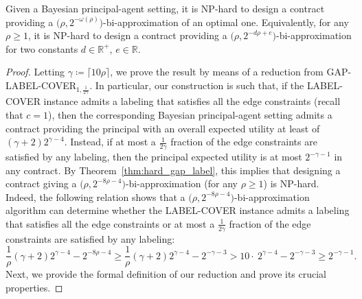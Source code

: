 \begin{theorem} \label{thm:hard_label}
	Given a Bayesian principal-agent setting, it is \textnormal{\textsf{NP}}-hard to design a contract providing a $\big(\rho,2^{-\omega(\rho)} \big)$-bi-approximation of an optimal one. Equivalently, for any $\rho \ge 1$, it is \textnormal{\textsf{NP}}-hard to design a contract providing a $\big(  \rho ,2^{- d \rho + e} \big)$-bi-approximation for two constants $d \in \mathbb{R}^+$, $e \in \mathbb{R}$.
\end{theorem}

\begin{proof}
	Letting $\gamma \coloneqq \lceil {10\rho} \rceil$, we prove the result by means of a reduction from \textsf{GAP-LABEL-COVER}$_{1,\frac{1}{2\gamma}}$.
	In particular, our construction is such that, if the \textsf{LABEL-COVER} instance admits a labeling that satisfies all the edge constraints (recall that $c=1$), then the corresponding Bayesian principal-agent setting admits a contract providing the principal with an overall expected utility at least of $(\gamma+2)2^{\gamma-4}$.
	Instead, if at most a $\frac{1}{2\gamma}$ fraction of the edge constraints are satisfied by any labeling, then the principal expected utility is at most $2^{-\gamma-1}$ in any contract.
	By Theorem~\ref{thm:hard_gap_label}, this implies that designing a contract giving a $\big( \rho,2^{-8 \rho-4} \big)$-bi-approximation (for any $\rho \ge 1$) is \textsf{NP}-hard.
	Indeed, the following relation shows that a $\big( \rho,2^{-8 \rho-4} \big)$-bi-approximation algorithm can determine whether the \textsf{LABEL-COVER} instance admits a labeling that satisfies all the edge constraints or at most a $\frac{1}{2\gamma}$ fraction of the edge constraints are satisfied by any labeling:
	\[
		\frac{1}{\rho} \left( \gamma+2 \right) 2^{\gamma-4}- 2^{-8\rho-4} \ge \frac{1}{\rho} \left( \gamma+2 \right) 2^{\gamma-4} -2^{-\gamma-3}> 10 \cdot \ 2^{\gamma-4}- 2^{-\gamma-3}\ge 2^{-\gamma-1}.
	\]
	Next, we provide the formal definition of our reduction and prove its crucial properties.
	

\end{proof}
